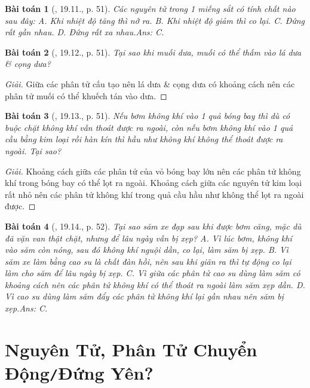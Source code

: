 \documentclass{article}
\newtheorem{baitoan}{Bài toán}
\begin{document}
\begin{baitoan}[\cite{SBT_Vat_Ly_8}, 19.11., p. 51]
	Các nguyên tử trong 1 miếng sắt có tính chất nào sau đây: {\sf A.} Khi nhiệt độ tăng thì nở ra. {\sf B.} Khi nhiệt độ giảm thì co lại. {\sf C.} Đứng rất gần nhau. {\sf D.} Đứng rất xa nhau.\hfill{\sf Ans: C.}
\end{baitoan}

\begin{baitoan}[\cite{SBT_Vat_Ly_8}, 19.12., p. 51]
	Tại sao khi muối dưa, muối có thể thấm vào lá dưa \& cọng dưa?
\end{baitoan}

\begin{proof}[Giải]
	Giữa các phân tử cấu tạo nên lá dưa \& cọng dưa có khoảng cách nên các phân tử muối có thể khuếch tán vào dưa.
\end{proof}

\begin{baitoan}[\cite{SBT_Vat_Ly_8}, 19.13., p. 51]
	Nếu bơm không khí vào 1 quả bóng bay thì dù có buộc chặt không khí vẫn thoát được ra ngoài, còn nếu bơm không khí vào 1 quả cầu bằng kim loại rồi hàn kín thì hầu như không khí không thể thoát được ra ngoài. Tại sao?
\end{baitoan}

\begin{proof}[Giải]
	Khoảng cách giữa các phân tử của vỏ bóng bay lớn nên các phân tử không khí trong bóng bay có thể lọt ra ngoài. Khoảng cách giữa các nguyên tử kim loại rất nhỏ nên các phân tử không khí trong quả cầu hầu như không thể lọt ra ngoài được.
\end{proof}

\begin{baitoan}[\cite{SBT_Vat_Ly_8}, 19.14., p. 52]
	Tại sao săm xe đạp sau khi được bơm căng, mặc dù đã vặn van thật chặt, nhưng để lâu ngày vẫn bị xẹp? {\sf A.} Vì lúc bơm, không khí vào săm còn nóng, sau đó không khí nguội dần, co lại, làm săm bị xẹp. {\sf B.} Vì săm xe làm bằng cao su là chất đàn hồi, nên sau khi giãn ra thì tự động co lại làm cho săm để lâu ngày bị xẹp. {\sf C.} Vì giữa các phân tử cao su dùng làm săm có khoảng cách nên các phân tử không khí có thể thoát ra ngoài làm săm xẹp dần. {\sf D.} Vì cao su dùng làm săm đẩy các phân tử không khí lại gần nhau nên săm bị xẹp.\hfill{\sf Ans: C.}
\end{baitoan}


\section{Nguyên Tử, Phân Tử Chuyển Động\texttt{/}Đứng Yên?}
\end{document}
